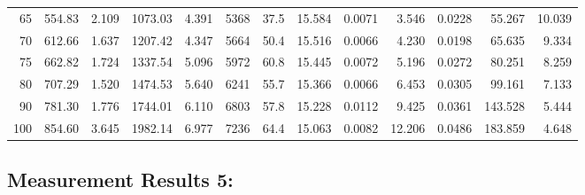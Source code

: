 \documentclass[10pt]{article}
\begin{document}
{\begin{tabular}{|r|rr|rr|rr|rr|rr|r|r|}
       65 &       554.83 &        2.109 &      1073.03 &        4.391 &         5368 &         37.5 &       15.584 &       0.0071 &        3.546 &       0.0228 &       55.267 &       10.039 \\
       70 &       612.66 &        1.637 &      1207.42 &        4.347 &         5664 &         50.4 &       15.516 &       0.0066 &        4.230 &       0.0198 &       65.635 &        9.334 \\
       75 &       662.82 &        1.724 &      1337.54 &        5.096 &         5972 &         60.8 &       15.445 &       0.0072 &        5.196 &       0.0272 &       80.251 &        8.259 \\
       80 &       707.29 &        1.520 &      1474.53 &        5.640 &         6241 &         55.7 &       15.366 &       0.0066 &        6.453 &       0.0305 &       99.161 &        7.133 \\
       90 &       781.30 &        1.776 &      1744.01 &        6.110 &         6803 &         57.8 &       15.228 &       0.0112 &        9.425 &       0.0361 &      143.528 &        5.444 \\
      100 &       854.60 &        3.645 &      1982.14 &        6.977 &         7236 &         64.4 &       15.063 &       0.0082 &       12.206 &       0.0486 &      183.859 &        4.648 \\
\hline
\end{tabular}
}



\subsection*{\large \bf Measurement Results 5:}
\end{document}
